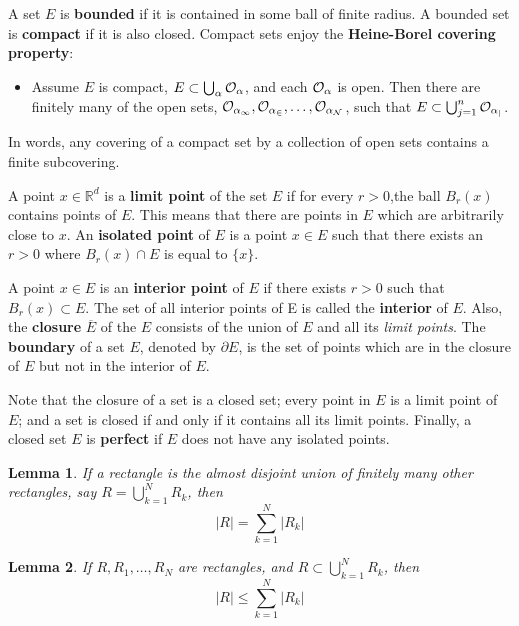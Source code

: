 \documentclass[
]{book}
\providecommand{\tightlist}{%
  \setlength{\itemsep}{0pt}\setlength{\parskip}{0pt}}
\newtheorem{lemma}{Lemma}[chapter]
\theoremstyle{definition}
\theoremstyle{definition}
\theoremstyle{definition}
\theoremstyle{definition}
\theoremstyle{remark}
\begin{document}
A set \(E\) is \textbf{bounded} if it is contained in some ball of finite radius. A bounded set is \textbf{compact} if it is also closed. Compact sets enjoy the \textbf{Heine-Borel covering property}:

\begin{itemize}
\tightlist
\item
  Assume \(E\) is compact, \(E\subset \bigcup_{\alpha}\cal{O}_{\alpha}\), and each \(\cal{O}_{\alpha}\) is open. Then there are finitely many of the open sets, \(\cal{O}_{\alpha_1},{O}_{\alpha_2},\dots,{O}_{\alpha_N}\), such that \(E\subset \bigcup_{j=1}^n\cal{O}_{\alpha_j}\).
\end{itemize}

In words, any covering of a compact set by a collection of open sets contains a finite subcovering.

A point \(x\in \mathbb{R}^d\) is a \textbf{limit point} of the set \(E\) if for every \(r>0\),the ball \(B_r(x)\) contains points of \(E\). This means that there are points in \(E\) which are arbitrarily close to \(x\). An \textbf{isolated point} of \(E\) is a point \(x\in E\) such that there exists an \(r > 0\) where \(B_r(x)\cap E\) is equal to \(\{x\}\).

A point \(x\in E\) is an \textbf{interior point} of \(E\) if there exists \(r>0\) such that \(B_r(x)\subset E\). The set of all interior points of E is called the \textbf{interior} of \(E\). Also, the \textbf{closure} \(\overline{E}\) of the \(E\) consists of the union of \(E\) and all its \emph{limit points}. The \textbf{boundary} of a set \(E\), denoted by \(\partial E\), is the set of points which are in the closure of \(E\) but not in the interior of \(E\).

Note that the closure of a set is a closed set; every point in \(E\) is a limit point of \(E\); and a set is closed if and only if it contains all its limit points. Finally, a closed set \(E\) is \textbf{perfect} if \(E\) does not have any isolated points.

\begin{lemma}
If a rectangle is the almost disjoint union of finitely many other rectangles, say \(R=\bigcup_{k=1}^NR_k\), then
\[
|R|=\sum_{k=1}^N |R_k|
\]
\end{lemma}

\begin{lemma}
If \(R,R_1,\dots,R_N\) are rectangles, and \(R\subset\bigcup_{k=1}^NR_k\), then
\[
|R|\leq\sum_{k=1}^N |R_k|
\]
\end{lemma}
\end{document}
